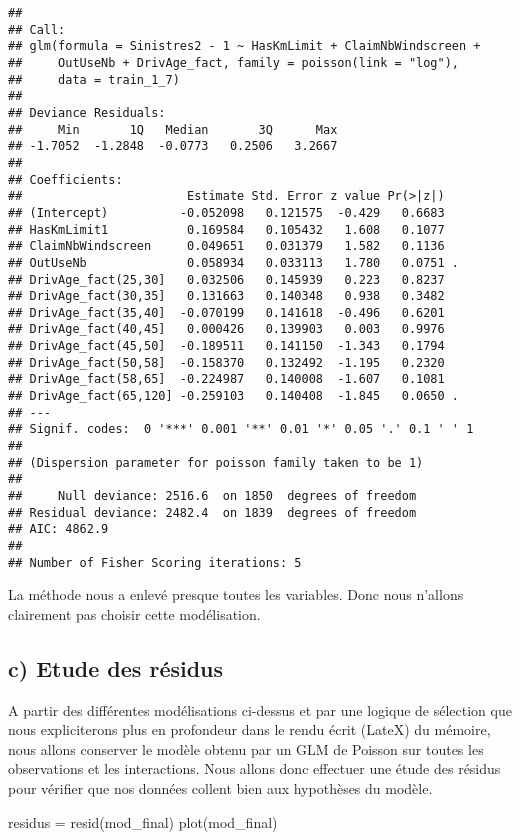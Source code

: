 \documentclass[
]{article}
\newenvironment{Shaded}{\begin{snugshade}}{\end{snugshade}}
\newcommand{\FunctionTok}[1]{\textcolor[rgb]{0.00,0.00,0.00}{#1}}
\newcommand{\NormalTok}[1]{#1}
\newcommand{\OtherTok}[1]{\textcolor[rgb]{0.56,0.35,0.01}{#1}}
\begin{document}
\begin{verbatim}
## 
## Call:
## glm(formula = Sinistres2 - 1 ~ HasKmLimit + ClaimNbWindscreen + 
##     OutUseNb + DrivAge_fact, family = poisson(link = "log"), 
##     data = train_1_7)
## 
## Deviance Residuals: 
##     Min       1Q   Median       3Q      Max  
## -1.7052  -1.2848  -0.0773   0.2506   3.2667  
## 
## Coefficients:
##                       Estimate Std. Error z value Pr(>|z|)  
## (Intercept)          -0.052098   0.121575  -0.429   0.6683  
## HasKmLimit1           0.169584   0.105432   1.608   0.1077  
## ClaimNbWindscreen     0.049651   0.031379   1.582   0.1136  
## OutUseNb              0.058934   0.033113   1.780   0.0751 .
## DrivAge_fact(25,30]   0.032506   0.145939   0.223   0.8237  
## DrivAge_fact(30,35]   0.131663   0.140348   0.938   0.3482  
## DrivAge_fact(35,40]  -0.070199   0.141618  -0.496   0.6201  
## DrivAge_fact(40,45]   0.000426   0.139903   0.003   0.9976  
## DrivAge_fact(45,50]  -0.189511   0.141150  -1.343   0.1794  
## DrivAge_fact(50,58]  -0.158370   0.132492  -1.195   0.2320  
## DrivAge_fact(58,65]  -0.224987   0.140008  -1.607   0.1081  
## DrivAge_fact(65,120] -0.259103   0.140408  -1.845   0.0650 .
## ---
## Signif. codes:  0 '***' 0.001 '**' 0.01 '*' 0.05 '.' 0.1 ' ' 1
## 
## (Dispersion parameter for poisson family taken to be 1)
## 
##     Null deviance: 2516.6  on 1850  degrees of freedom
## Residual deviance: 2482.4  on 1839  degrees of freedom
## AIC: 4862.9
## 
## Number of Fisher Scoring iterations: 5
\end{verbatim}

La méthode nous a enlevé presque toutes les variables. Donc nous
n'allons clairement pas choisir cette modélisation.

\hypertarget{c-etude-des-ruxe9sidus}{%
\subsection{c) Etude des résidus}\label{c-etude-des-ruxe9sidus}}

A partir des différentes modélisations ci-dessus et par une logique de
sélection que nous expliciterons plus en profondeur dans le rendu écrit
(LateX) du mémoire, nous allons conserver le modèle obtenu par un GLM de
Poisson sur toutes les observations et les interactions. Nous allons
donc effectuer une étude des résidus pour vérifier que nos données
collent bien aux hypothèses du modèle.

\begin{Shaded}
\begin{Highlighting}[]
\NormalTok{residus }\OtherTok{=} \FunctionTok{resid}\NormalTok{(mod\_final)}
\FunctionTok{plot}\NormalTok{(mod\_final)}
\end{Highlighting}
\end{Shaded}
\end{document}
